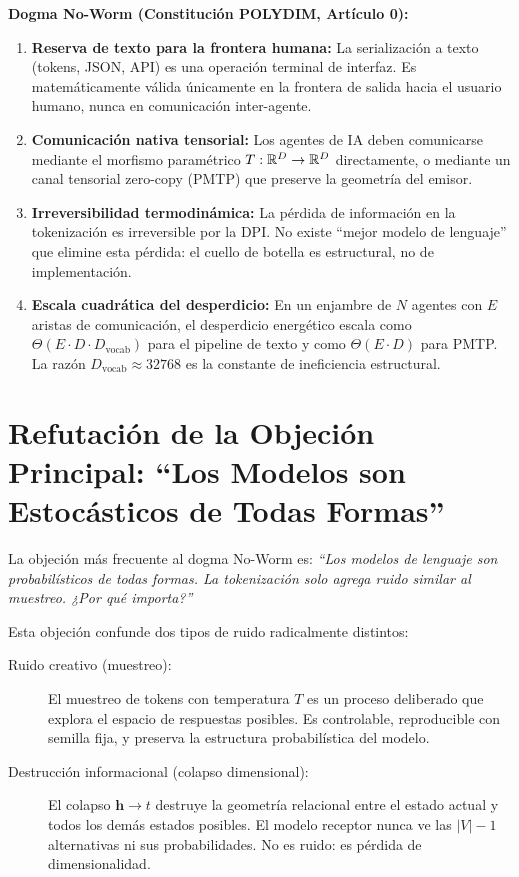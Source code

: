 \begin{polydimbox}
\textbf{Dogma No-Worm (Constitución POLYDIM, Artículo 0):}

\begin{enumerate}
\item \textbf{Reserva de texto para la frontera humana:} La serialización a texto
(tokens, JSON, API) es una operación terminal de interfaz. Es matemáticamente
válida únicamente en la frontera de salida hacia el usuario humano, nunca en
comunicación inter-agente.

\item \textbf{Comunicación nativa tensorial:} Los agentes de IA deben comunicarse
mediante el morfismo paramétrico $T: \mathbb{R}^D \to \mathbb{R}^D$ directamente, o mediante un
canal tensorial zero-copy (PMTP) que preserve la geometría del emisor.

\item \textbf{Irreversibilidad termodinámica:} La pérdida de información en la
tokenización es irreversible por la DPI. No existe ``mejor modelo de lenguaje''
que elimine esta pérdida: el cuello de botella es estructural, no de implementación.

\item \textbf{Escala cuadrática del desperdicio:} En un enjambre de $N$ agentes
con $E$ aristas de comunicación, el desperdicio energético escala como
$\Theta(E \cdot D \cdot D_{\text{vocab}})$ para el pipeline de texto y como
$\Theta(E \cdot D)$ para PMTP. La razón $D_{\text{vocab}} \approx 32768$
es la constante de ineficiencia estructural.
\end{enumerate}
\end{polydimbox}

\section{Refutación de la Objeción Principal: ``Los Modelos son Estocásticos de Todas Formas''}

La objeción más frecuente al dogma No-Worm es: \textit{``Los modelos de lenguaje
son probabilísticos de todas formas. La tokenización solo agrega ruido similar
al muestreo. ¿Por qué importa?''}

Esta objeción confunde dos tipos de ruido radicalmente distintos:

\begin{description}
\item[Ruido creativo (muestreo):] El muestreo de tokens con temperatura $T$ es
un proceso deliberado que explora el espacio de respuestas posibles. Es controlable,
reproducible con semilla fija, y preserva la estructura probabilística del modelo.

\item[Destrucción informacional (colapso dimensional):] El colapso $\mathbf{h} \to t$
destruye la geometría relacional entre el estado actual y todos los demás estados
posibles. El modelo receptor nunca ve las $|V|-1$ alternativas ni sus probabilidades.
No es ruido: es pérdida de dimensionalidad.
\end{description}

